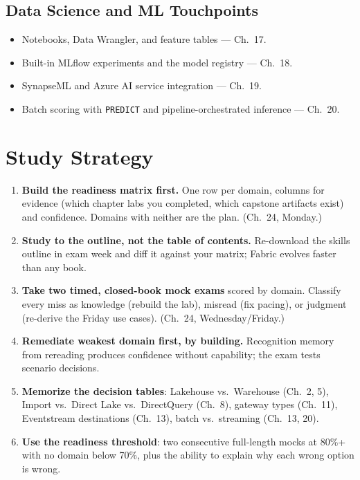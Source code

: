 \subsection{Data Science and ML Touchpoints}
\begin{itemize}
    \item Notebooks, Data Wrangler, and feature tables --- Ch.~17.
    \item Built-in MLflow experiments and the model registry --- Ch.~18.
    \item SynapseML and Azure AI service integration --- Ch.~19.
    \item Batch scoring with \texttt{PREDICT} and pipeline-orchestrated inference --- Ch.~20.
\end{itemize}

\section{Study Strategy}
%
\begin{enumerate}
    \item \textbf{Build the readiness matrix first.} One row per domain, columns for evidence
    (which chapter labs you completed, which capstone artifacts exist) and confidence. Domains
    with neither are the plan. (Ch.~24, Monday.)
    \item \textbf{Study to the outline, not the table of contents.} Re-download the skills
    outline in exam week and diff it against your matrix; Fabric evolves faster than any book.
    \item \textbf{Take two timed, closed-book mock exams} scored by domain. Classify every miss
    as knowledge (rebuild the lab), misread (fix pacing), or judgment (re-derive the Friday use
    cases). (Ch.~24, Wednesday/Friday.)
    \item \textbf{Remediate weakest domain first, by building.} Recognition memory from
    rereading produces confidence without capability; the exam tests scenario decisions.
    \item \textbf{Memorize the decision tables}: Lakehouse vs.\ Warehouse (Ch.~2, 5), Import vs.\
    Direct Lake vs.\ DirectQuery (Ch.~8), gateway types (Ch.~11), Eventstream destinations
    (Ch.~13), batch vs.\ streaming (Ch.~13, 20).
    \item \textbf{Use the readiness threshold}: two consecutive full-length mocks at 80\%+ with
    no domain below 70\%, plus the ability to explain why each wrong option is wrong.
\end{enumerate}

